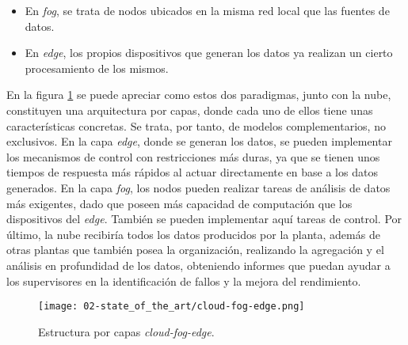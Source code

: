 \begin{itemize}
  \item En \textit{fog}, se trata de nodos ubicados en la misma red local que
        las fuentes de datos.
  \item En \textit{edge}, los propios dispositivos que generan los datos ya
        realizan un cierto procesamiento de los mismos.
\end{itemize}

En la figura \ref{fig:02-cloud_fog_edge} se puede apreciar como estos dos
paradigmas, junto con la nube, constituyen una arquitectura por capas, donde
cada uno de ellos tiene unas características concretas. Se trata, por tanto, de
modelos complementarios, no exclusivos. En la capa \textit{edge}, donde se
generan los datos, se pueden implementar los mecanismos de control con
restricciones más duras, ya que se tienen unos tiempos de respuesta más rápidos
al actuar directamente en base a los datos generados. En la capa \textit{fog},
los nodos pueden realizar tareas de análisis de datos más exigentes, dado que
poseen más capacidad de computación que los dispositivos del \textit{edge}.
También se pueden implementar aquí tareas de control. Por último, la nube
recibiría todos los datos producidos por la planta, además de otras plantas que
también posea la organización, realizando la agregación y el análisis en
profundidad de los datos, obteniendo informes que puedan ayudar a los
supervisores en la identificación de fallos y la mejora del rendimiento.

\begin{figure}
  \centering
  \texttt{[image: 02-state\_of\_the\_art/cloud-fog-edge.png]}
  \caption{Estructura por capas \textit{cloud-fog-edge}.}
  \label{fig:02-cloud_fog_edge}
\end{figure}

